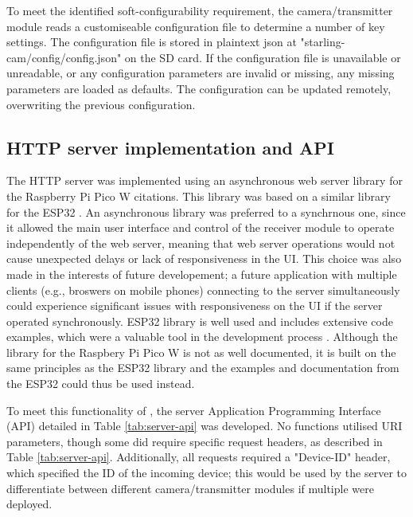 \documentclass[class=report,11pt,crop=false]{standalone}
\begin{document}
To meet the identified soft-configurability requirement, the camera/transmitter module reads a customiseable configuration file to determine a number of key settings. The configuration file is stored in plaintext json at "starling-cam/config/config.json" on the SD card. If the configuration file is unavailable or unreadable, or any configuration parameters are invalid or missing, any missing parameters are loaded as defaults. The configuration can be updated remotely, overwriting the previous configuration.

\subsection{HTTP server implementation and API}

The HTTP server was implemented using an asynchronous web server library for the Raspberry Pi Pico W citations\cite{hoang2023async}. This library was based on a similar library for the ESP32 \cite{gochkov2023async}. An asynchronous library was preferred to a synchrnous one, since it allowed the main user interface and control of the receiver module to operate independently of the web server, meaning that web server operations would not cause unexpected delays or lack of responsiveness in the UI. This choice was also made in the interests of future developement; a future application with multiple clients (e.g., broswers on mobile phones) connecting to the server simultaneously could experience significant issues with responsiveness on the UI if the server operated synchronously. ESP32 library is well used and includes extensive code examples, which were a valuable tool in the development process  \cite{hoang2023async}. Although the library for the Raspbery Pi Pico W is not as well documented, it is built on the same principles as the ESP32 library and the examples and documentation from the ESP32 could thus be used instead.

To meet this functionality of , the server Application Programming Interface (API) detailed in Table \ref{tab:server-api} was developed. No functions utilised URI parameters, though some did require specific request headers, as described in Table \ref{tab:server-api}. Additionally, all requests required a "Device-ID" header, which specified the ID of the incoming device; this would be used by the server to differentiate between different camera/transmitter modules if multiple were deployed.
\end{document}
